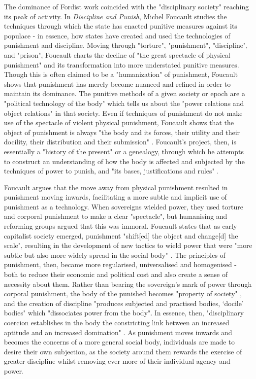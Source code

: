 The dominance of Fordist work coincided with the "disciplinary society" reaching its peak of activity. In \emph{Discipline and Punish}, Michel Foucault studies the techniques through which the state has enacted punitive measures against its populace - in essence, how states have created and used the technologies of punishment and discipline. Moving through "torture", "punishment", "discipline", and "prison", Foucault charts the decline of "the great spectacle of physical punishment" \citeyearpar[p. 14]{foucault_discipline_1977} and its transformation into more understated punitive measures. Though this is often claimed to be a "humanization" \citeyearpar[p. 7]{foucault_discipline_1977} of punishment, Foucault shows that punishment has merely become nuanced and refined in order to maintain its dominance. The punitive methods of a given society or epoch are a "political technology of the body" which tells us about the "power relations and object relations" \citeyearpar[p. 24]{foucault_discipline_1977} in that society. Even if techniques of punishment do not make use of the spectacle of violent physical punishment, Foucault shows that the object of punishment is always "the body and its forces, their utility and their docility, their distribution and their submission" \citeyearpar[p. 25]{foucault_discipline_1977}. Foucault's project, then, is essentially a "history of the present" \citeyearpar[p. 31]{foucault_discipline_1977} or a genealogy, through which he attempts to construct an understanding of how the body is affected and subjected by the techniques of power to punish, and "its bases, justifications and rules" \citeyearpar[p. 23]{foucault_discipline_1977}.

Foucault argues that the move away from physical punishment resulted in punishment moving inwards, facilitating a more subtle and implicit use of punishment as a technology. When sovereigns wielded power, they used torture and corporal punishment to make a clear "spectacle", but humanising and reforming groups argued that this was immoral. Foucault states that as early capitalist society emerged, punishment "shift[ed] the object and change[d] the scale", resulting in the development of new tactics to wield power that were "more subtle but also more widely spread in the social body" \citeyearpar[p. 89]{foucault_discipline_1977}. The principles of punishment, then, became more regularised, universalised and homogenised - both to reduce their economic and political cost and also create a sense of necessity about them. Rather than bearing the sovereign's mark of power through corporal punishment, the body of the punished becomes "property of society" \citeyearpar[p. 109]{foucault_discipline_1977}, and the creation of discipline "produces subjected and practised bodies, `docile' bodies" which "dissociates power from the body". In essence, then, "disciplinary coercion establishes in the body the constricting link between an increased aptitude and an increased domination" \citeyearpar[p. 138]{foucault_discipline_1977}. As punishment moves inwards and becomes the concerns of a more general social body, individuals are made to desire their own subjection, as the society around them rewards the exercise of greater discipline whilst removing ever more of their individual agency and power.

